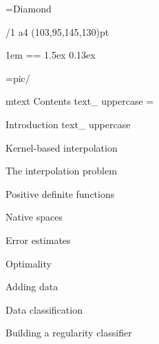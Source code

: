 \useOpTeX  %


\hyperlinks \Black \Black
{}

\enlang
\fontfam[BaskervilleMT]
\fontfam[EBGaramond]
\fontfam[TypewriterMT]
\BaskervilleMT
\typosize[12.2/14.42]
\fontdef\rmfixex{\rm}
\fontdef\itfixed{\it}
\fontdef\bffixed{\bf}
\fontdef\bifixed{\bi}

\font\symbols=Diamond %
\def\QED{\hbox{\symbols\resizethefont \,❖}}
\famvardef{}
\famvardef{}
\famvardef\tt{\TypewriterMT{}\typoscale[870/]\rm}


\margins/1 a4 (103,95,145,130)pt


\parindent 1em
\iindent=\parindent \ttindent=\parindent
\parskip 1.5ex
 0.13ex

\picdir={pic/}


\let\omtext\_mtext
\def\_mtext#1{CONTENTS}
\let\uppercase\ignoreit
\nonum\notoc\chap Contents
\let\_mtext\omtext
\let\uppercase\_uppercase
\bigskip
\maketoc
{}
\footline={}
\vfill\eject


\def\_mtext#1{INTRODUCTION}
\let\uppercase\ignoreit
\nonum\chap Introduction
\let\_mtext\omtext
\let\uppercase\_uppercase


\chap Kernel-based interpolation

\def\sectitle{The interpolation problem}
\ea\sec\sectitle



\sec[positivesec] Positive definite functions


\sec Native spaces


\sec[errorsec] Error estimates


\sec Optimality


\sec[addingsec] Adding data


\chap Data classification

\sec[buildingsec] Building a regularity classifier



